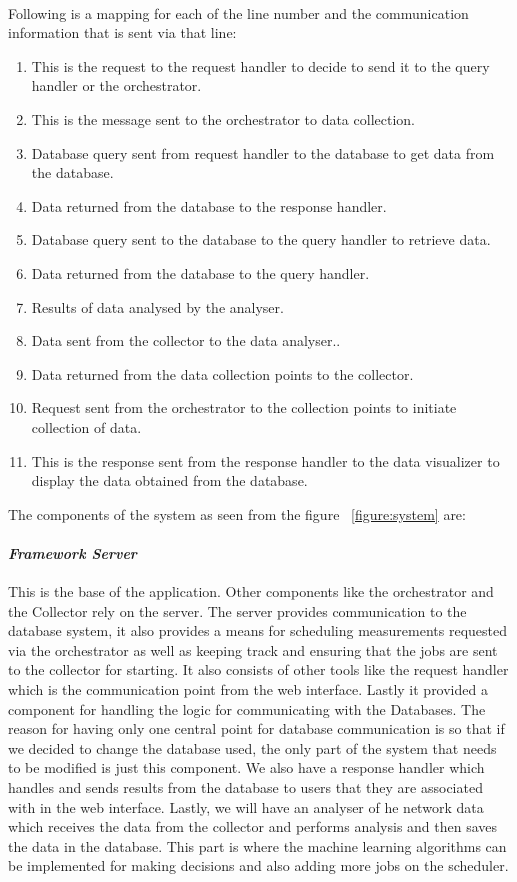 \paragraph{}
Following is a mapping for each of the line number and the communication information that is sent via that line:
\begin{enumerate}
	\item  This is the request to the request handler to decide to send it to the query handler or the orchestrator.
	\item This is the message sent to the orchestrator to data collection.
	\item Database query sent from request handler to the database to get data from the database.
	\item Data returned from the database to the response handler.
	\item Database query sent  to the database to the query handler to retrieve data.
	\item Data returned from the database to the query handler.
	\item Results of data analysed by the analyser.
	\item Data sent from the collector to the data analyser..
	\item Data returned from the data collection points to the collector.
	\item Request sent from the orchestrator to the collection points to initiate collection of data.
	\item This is the response sent from the response handler to the data visualizer to display the data obtained from the database.
	
	\end{enumerate}
The components of the system as seen from the figure ~\ref{figure:system} are:
\paragraph{\textit{Framework Server}}
This is the base of the application. Other components like the orchestrator and the Collector rely on the server. The server provides communication to the database system, it also provides a means for scheduling measurements requested via the orchestrator as well as keeping track and ensuring that the jobs are sent to the collector for starting. It also consists of other tools like the request handler which is the communication point from the web interface. Lastly it provided a component for handling the logic for communicating with the Databases. The reason for having only one central point for database communication is so that if we decided to change the database used, the only part of the system that needs to be modified is just this component. We also have a response handler which handles and sends results from the database to users that they are associated with in the web interface. Lastly, we will have an analyser of he network data which receives the data from the collector and performs analysis and then saves the data in the database. This part is where the machine learning algorithms can be implemented for making decisions and also adding more jobs on the scheduler.

